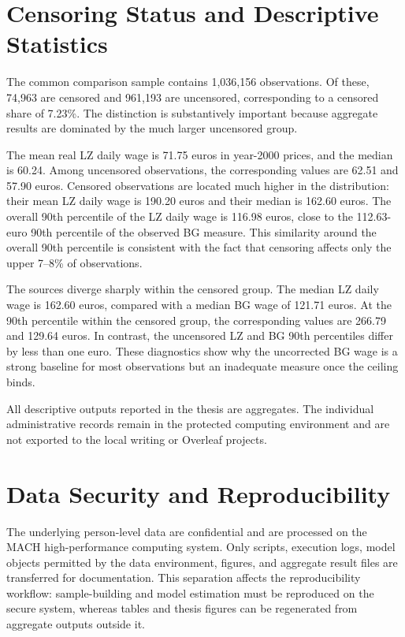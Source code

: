 \documentclass[12pt,a4paper,oneside,titlepage]{book}
\begin{document}
\section{Censoring Status and Descriptive Statistics}
The common comparison sample contains 1,036,156 observations. Of these, 74,963 are censored and 961,193 are uncensored, corresponding to a censored share of 7.23\%. The distinction is substantively important because aggregate results are dominated by the much larger uncensored group.

The mean real LZ daily wage is 71.75 euros in year-2000 prices, and the median is 60.24. Among uncensored observations, the corresponding values are 62.51 and 57.90 euros. Censored observations are located much higher in the distribution: their mean LZ daily wage is 190.20 euros and their median is 162.60 euros. The overall 90th percentile of the LZ daily wage is 116.98 euros, close to the 112.63-euro 90th percentile of the observed BG measure. This similarity around the overall 90th percentile is consistent with the fact that censoring affects only the upper 7--8\% of observations.

The sources diverge sharply within the censored group. The median LZ daily wage is 162.60 euros, compared with a median BG wage of 121.71 euros. At the 90th percentile within the censored group, the corresponding values are 266.79 and 129.64 euros. In contrast, the uncensored LZ and BG 90th percentiles differ by less than one euro. These diagnostics show why the uncorrected BG wage is a strong baseline for most observations but an inadequate measure once the ceiling binds.

All descriptive outputs reported in the thesis are aggregates. The individual administrative records remain in the protected computing environment and are not exported to the local writing or Overleaf projects.

\section{Data Security and Reproducibility}

The underlying person-level data are confidential and are processed on the MACH high-performance computing system. Only scripts, execution logs, model objects permitted by the data environment, figures, and aggregate result files are transferred for documentation. This separation affects the reproducibility workflow: sample-building and model estimation must be reproduced on the secure system, whereas tables and thesis figures can be regenerated from aggregate outputs outside it.
\end{document}
